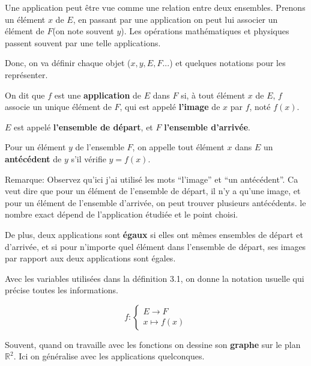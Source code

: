 \documentclass{article}
\begin{document}
Une application peut être vue comme une relation entre deux ensembles. Prenons un élément $x$ de $E$, en passant par une application on peut lui associer un élément de $F$(on note souvent $y$). Les opérations mathématiques et physiques passent souvent par une telle applications.

Donc, on va définir chaque objet ($x, y, E, F...$) et quelques notations pour les représenter.

\begin{tcolorbox}[colback=red!5!white,colframe=red!75!black,title=Définition 3.1]

On dit que $f$ est une \textbf{application} de $E$ dans $F$ si, à tout élément $x$ de $E$, $f$ associe un unique élément de $F$, qui est appelé \textbf{l'image} de $x$ par $f$, noté $f(x)$.

$E$ est appelé \textbf{l'ensemble de départ}, et $F$ \textbf{l'ensemble d'arrivée}.

Pour un élément $y$ de l'ensemble $F$, on appelle tout élément $x$ dans $E$ un \textbf{antécédent} de $y$ s'il vérifie $y=f(x)$.


\end{tcolorbox}

Remarque: Observez qu'ici j'ai utilisé les mots ``l'image'' et ``un antécédent''. Ca veut dire que pour un élément de l'ensemble de départ, il n'y a qu'une image, et pour un élément de l'ensemble d'arrivée, on peut trouver plusieurs antécédents. le nombre exact dépend de l'application étudiée et le point choisi.

De plus, deux applications sont \textbf{égaux} si elles ont mêmes ensembles de départ et d'arrivée, et si pour n'importe quel élément dans l'ensemble de départ, ses images par rapport aux deux applications sont égales.

\begin{tcolorbox}[colback=yellow!5!white,colframe=yellow!75!black,title=Notation 3.1]

Avec les variables utilisées dans la définition 3.1, on donne la notation usuelle qui précise toutes les informations.

\[
f : 
\begin{cases} 
E \to F \\
x \mapsto f(x)
\end{cases}
\]

\end{tcolorbox}

Souvent, quand on travaille avec les fonctions on dessine son \textbf{graphe} sur le plan $\mathbb{R}^{2}$. Ici on généralise avec les applications quelconques.
\end{document}
